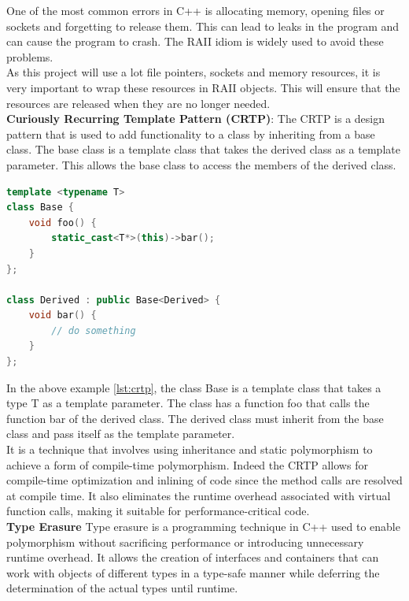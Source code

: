 \begin{spacing}{1.2}
    One of the most common errors in C++ is allocating memory, opening files or sockets and forgetting
    to release them. This can lead to leaks in the program and can cause the program to crash.
    The RAII idiom is widely used to avoid these problems.\\

    As this project will use a lot file pointers, sockets and memory resources, it is very important
    to wrap these resources in RAII objects. This will ensure that the resources are released when
    they are no longer needed.\\


    \textbf{Curiously Recurring Template Pattern (CRTP)}:
    The CRTP is a design pattern that is used to add functionality to a class by inheriting
    from a base class. The base class is a template class that takes the derived class as a
    template parameter. This allows the base class to access the members of the derived class.\\

    \begin{lstlisting}[language=C++,caption={Example of CRTP},label={lst:crtp}]
template <typename T>
class Base {
    void foo() {
        static_cast<T*>(this)->bar();
    }
};

class Derived : public Base<Derived> {
    void bar() {
        // do something
    }
};        
    \end{lstlisting}

    In the above example \ref{lst:crtp}, the class Base is a template class that takes a type T
    as a template parameter. The class has a function foo that calls the function bar of the
    derived class. The derived class must inherit from the base class and pass itself as the
    template parameter.\\

    It is a technique that involves using inheritance and static polymorphism to achieve a
    form of compile-time polymorphism. Indeed the CRTP allows for compile-time optimization
    and inlining of code since the method calls are resolved at compile time. It also
    eliminates the runtime overhead associated with virtual function calls, making it
    suitable for performance-critical code.\\


    \textbf{Type Erasure}
    Type erasure is a programming technique in C++ used to enable polymorphism without
    sacrificing performance or introducing unnecessary runtime overhead. It allows the
    creation of interfaces and containers that can work with objects of different types
    in a type-safe manner while deferring the determination of the actual types until runtime.\\


\end{spacing}
